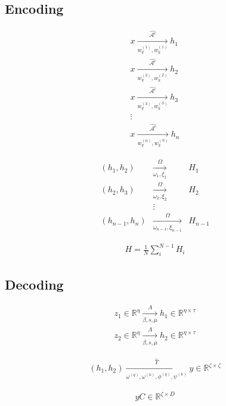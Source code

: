 \documentclass{article}
\begin{document}
\subsection{Encoding}
\begin{minipage}{0.3\textwidth}
\begin{eqnarray*}
	x \xrightarrow[w_{q}^{(1)}, w_{k}^{(1)}]{\widehat{\mathcal{A}^{c}}} h_{1} \\
	x \xrightarrow[w_{q}^{(2)}, w_{k}^{(2)}]{\widehat{\mathcal{A}^{c}}} h_{2} \\
	x \xrightarrow[w_{q}^{(3)}, w_{k}^{(3)}]{\widehat{\mathcal{A}^{c}}} h_{3} \\
	\vdots \\
	x \xrightarrow[w_{q}^{(n)}, w_{k}^{(n)}]{\widehat{\mathcal{A}^{c}}} h_{n}
\end{eqnarray*}
\end{minipage}%
\begin{minipage}{0.3\textwidth}
	\begin{eqnarray*}
		(h_{1}, h_{2})& \xrightarrow[\omega_{1}, \xi_{1}]{\Omega}& H_{1} \\
		(h_{2}, h_{3})& \xrightarrow[\omega_{2}, \xi_{2}]{\Omega}& H_{2} \\
		& \vdots \\
		(h_{n-1}, h_{n})& \xrightarrow[\omega_{n-1}, \xi_{n-1}]{\Omega}&  H_{n-1}
	\end{eqnarray*}
\end{minipage}%
\begin{minipage}{0.3\textwidth}
	\begin{eqnarray*}
		H = \frac{1}{N}\sum_{i}^{N-1} H_{i}
	\end{eqnarray*}
\end{minipage}

\subsection{Decoding}
\begin{minipage}{0.3\textwidth}
\begin{eqnarray*}
	z_{1}\in \mathbb{R}^{\eta} \xrightarrow[\beta, s, \mu]{\Lambda} h_{1} \in \mathbb{R}^{\eta\times \tau } \\
	z_{2}\in \mathbb{R}^{\eta} \xrightarrow[\beta, s, \mu]{\Lambda} h_{2}\in \mathbb{R}^{\eta\times \tau }
\end{eqnarray*}
\end{minipage}%
\begin{minipage}{0.3\textwidth}
	\begin{eqnarray*}
		(h_{1}, h_{2})\xrightarrow[\omega^{(q)}, \omega^{(k)}, \phi^{(q)}, \psi^{(k)}]{\widehat{\Upsilon}} y \in \mathbb{R}^{\zeta\times \zeta}
	\end{eqnarray*}
\end{minipage}%
\begin{minipage}{0.3\textwidth}
	\begin{eqnarray*}
		yC\in \mathbb{R}^{\zeta\times D}
	\end{eqnarray*}
\end{minipage}
\end{document}
